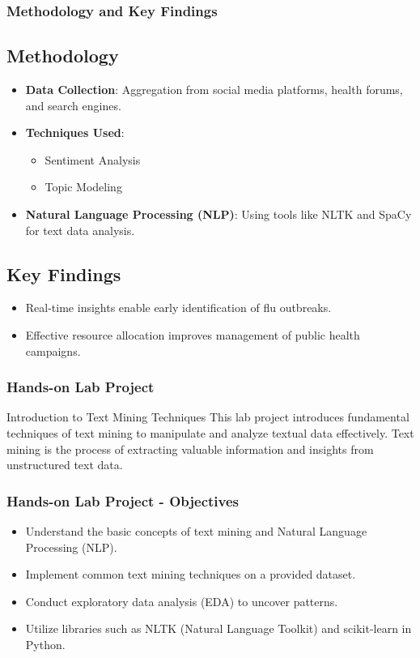 \documentclass[aspectratio=169]{beamer}
\begin{document}
\begin{frame}[fragile]
    \frametitle{Methodology and Key Findings}
    
    \subsection*{Methodology}
    \begin{itemize}
        \item \textbf{Data Collection}: Aggregation from social media platforms, health forums, and search engines.
        \item \textbf{Techniques Used}:
        \begin{itemize}
            \item Sentiment Analysis
            \item Topic Modeling
        \end{itemize}
        \item \textbf{Natural Language Processing (NLP)}: Using tools like NLTK and SpaCy for text data analysis.
    \end{itemize}
    
    \subsection*{Key Findings}
    \begin{itemize}
        \item Real-time insights enable early identification of flu outbreaks.
        \item Effective resource allocation improves management of public health campaigns.
    \end{itemize}
\end{frame}

\begin{frame}
    \frametitle{Hands-on Lab Project}
    \begin{block}{Introduction to Text Mining Techniques}
        This lab project introduces fundamental techniques of text mining to manipulate and analyze textual data effectively.
        Text mining is the process of extracting valuable information and insights from unstructured text data.
    \end{block}
\end{frame}

\begin{frame}
    \frametitle{Hands-on Lab Project - Objectives}
    \begin{itemize}
        \item Understand the basic concepts of text mining and Natural Language Processing (NLP).
        \item Implement common text mining techniques on a provided dataset.
        \item Conduct exploratory data analysis (EDA) to uncover patterns.
        \item Utilize libraries such as NLTK (Natural Language Toolkit) and scikit-learn in Python.
    \end{itemize}
\end{frame}
\end{document}
